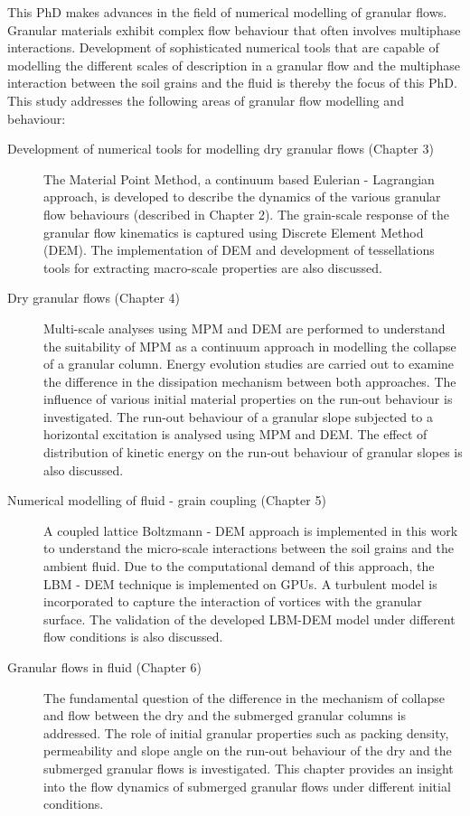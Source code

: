 This PhD makes advances in the field of numerical modelling of granular flows. 
Granular materials exhibit complex flow behaviour that often involves 
multiphase interactions. Development of sophisticated numerical tools that are 
capable of modelling the different scales of description in a granular flow and 
the multiphase interaction between the soil grains and the fluid is thereby the 
focus of this PhD. This study addresses the following 
areas of granular flow modelling and behaviour:
%
\begin{description}
\item[Development of numerical tools for modelling dry granular flows (Chapter 
3)]{The Material Point Method, a continuum based Eulerian - Lagrangian 
approach, is developed to describe the dynamics of the various granular flow 
behaviours (described in Chapter 2). The grain-scale response of the granular 
flow kinematics is captured using Discrete Element Method (DEM). The 
implementation of DEM and development of tessellations tools for extracting 
macro-scale properties are also discussed.}

\item[Dry granular flows (Chapter 4)] {Multi-scale analyses using MPM and DEM 
are performed to understand the suitability of MPM as a continuum approach in 
modelling the collapse of a granular column. Energy evolution studies are 
carried out to examine the difference in the dissipation mechanism between both 
approaches. The influence of various initial material properties on the run-out 
behaviour is investigated. The run-out behaviour of a granular slope subjected 
to a horizontal excitation is analysed using MPM and DEM. The effect of 
distribution of kinetic energy on the run-out behaviour of granular slopes is 
also discussed.}

\item[Numerical modelling of fluid - grain coupling (Chapter 5)]{A coupled 
lattice Boltzmann - DEM approach is implemented in this work to understand the 
micro-scale interactions between the soil grains and the ambient fluid. Due to 
the computational demand of this approach, the LBM - DEM technique is 
implemented on GPUs. A turbulent model is incorporated to capture the
interaction of vortices with the granular surface. The validation of 
the developed LBM-DEM model under different flow conditions is also discussed.}

\item[Granular flows in fluid (Chapter 6)]{The fundamental question of the 
difference in the mechanism of collapse and flow between the dry and the 
submerged granular columns is addressed. The role of initial granular 
properties such as packing density, permeability and slope angle on the run-out 
behaviour of the dry and the submerged granular flows is investigated. This 
chapter provides an insight into the flow dynamics of submerged granular flows 
under different initial conditions.
}
\end{description}

